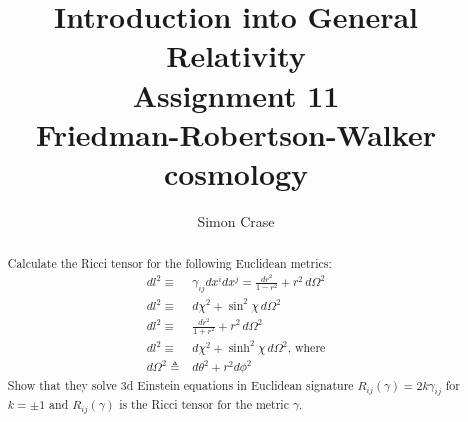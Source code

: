 \documentclass[]{article}
\title{Introduction into General Relativity\\Assignment 11\\Friedman-Robertson-Walker cosmology}
\author{Simon Crase}
\begin{document}
\maketitle

\begin{abstract}
Calculate the Ricci tensor for the following Euclidean metrics:
\begin{align*}
dl^2\equiv&\gamma_{ij}dx^idx^j=\frac{dr^2}{1-r^2}+r^2\,d\Omega^2\\
dl^2\equiv&d\chi^2+\sin^2 \chi\,d\Omega^2\\
dl^2\equiv&\frac{dr^2}{1+r^2}+r^2\,d\Omega^2\\
dl^2\equiv&d\chi^2+\sinh^2 \chi\,d\Omega^2\text{, where}\\
d\Omega^2\triangleq & d\theta^2 + r^2 d\phi^2
\end{align*}
Show that they solve 3d Einstein equations in Euclidean signature $R_{ij}(\gamma)=2k\gamma_{ij}$ for $k=\pm 1$ and $R_{ij}(\gamma)$ is the Ricci tensor for the metric $\gamma$.
\end{abstract}

\tableofcontents
\end{document}
